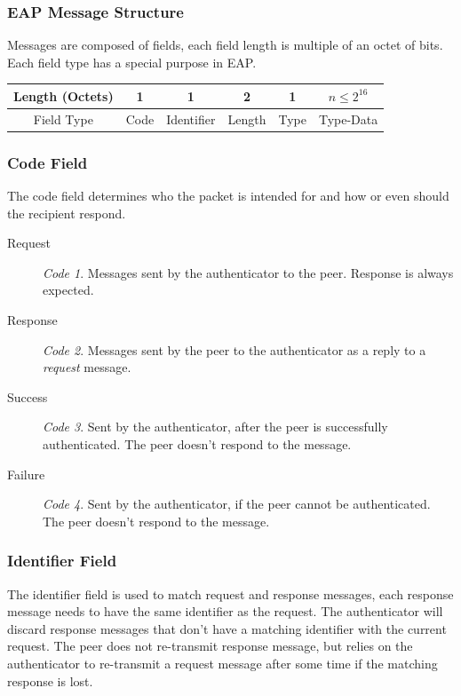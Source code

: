 \subsubsection{EAP Message Structure}
Messages are composed of fields, each field length is multiple of an octet of bits.
Each field type has a special purpose in EAP.

\begin{center}
	\begin{tabular}{|c|c|c|c|c|c|}
		\hline
		Length (Octets) & 1 & 1 & 2 & 1 & $n \le 2^{16}$\\
		\hline
		Field Type & Code & Identifier & Length & Type & Type-Data\\
		\hline
	\end{tabular}
\end{center}


\subsubsection{Code Field}
The code field determines who the packet is intended for and how or even should the recipient respond.

\begin{description}
	\item[Request]\textit{Code 1}. Messages sent by the authenticator to the peer. Response is always expected.
	\item[Response]\textit{Code 2}. Messages sent by the peer to the authenticator as a reply to a \textit{request} message.
	\item[Success]\textit{Code 3}. Sent by the authenticator, after the peer is successfully authenticated. The peer doesn't respond to the message.
	\item[Failure]\textit{Code 4}. Sent by the authenticator, if the peer cannot be authenticated. The peer doesn't respond to the message.
\end{description}

\subsubsection{Identifier Field}
The identifier field is used to match request and response messages, each response message needs to have the same identifier as the request.
The authenticator will discard response messages that don't have a matching identifier with the current request.
The peer does not re-transmit response message, but relies on the authenticator to re-transmit a request message after some time if the matching response is lost.

